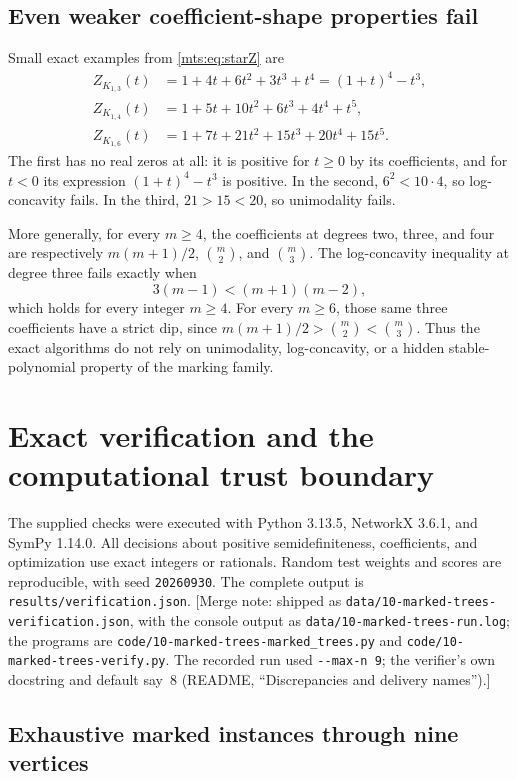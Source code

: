 \documentclass[11pt]{article}
\numberwithin{equation}{section}
\theoremstyle{definition}
\begin{document}
\subsection{Even weaker coefficient-shape properties fail}

Small exact examples from \eqref{mts:eq:starZ} are
\begin{align}
 Z_{K_{1,3}}(t)&=1+4t+6t^2+3t^3+t^4=(1+t)^4-t^3,\label{mts:eq:Z3}\\
 Z_{K_{1,4}}(t)&=1+5t+10t^2+6t^3+4t^4+t^5,\label{mts:eq:Z4}\\
 Z_{K_{1,6}}(t)&=1+7t+21t^2+15t^3+20t^4+15t^5.
 \label{mts:eq:Z6}
\end{align}
The first has no real zeros at all: it is positive for $t\ge0$ by its
coefficients, and for $t<0$ its expression $(1+t)^4-t^3$ is positive.
In the second, $6^2<10\cdot4$, so log-concavity fails. In the third,
$21>15<20$, so unimodality fails.

More generally, for every $m\ge4$, the coefficients at degrees two,
three, and four are respectively $m(m+1)/2$, $\binom m2$, and
$\binom m3$. The log-concavity inequality at degree three fails exactly
when
\[
 3(m-1)<(m+1)(m-2),
\]
which holds for every integer $m\ge4$. For every $m\ge6$, those same three
coefficients have a strict dip, since
$m(m+1)/2>\binom m2<\binom m3$. Thus the exact algorithms do not rely on
unimodality, log-concavity, or a hidden stable-polynomial property of the
marking family.

\section{Exact verification and the computational trust boundary}\label{mts:sec:verification}

The supplied checks were executed with Python 3.13.5, NetworkX 3.6.1, and
SymPy 1.14.0. All decisions about positive semidefiniteness, coefficients,
and optimization use exact integers or rationals. Random test weights and
scores are reproducible, with seed \texttt{20260930}. The complete output
is \texttt{results/verification.json}.
[Merge note: shipped as \nolinkurl{data/10-marked-trees-verification.json},
with the console output as \nolinkurl{data/10-marked-trees-run.log}; the
programs are \nolinkurl{code/10-marked-trees-marked_trees.py} and
\nolinkurl{code/10-marked-trees-verify.py}. The recorded run used
\texttt{-{}-max-n 9}; the verifier's own docstring and default say~8
(README, ``Discrepancies and delivery names'').]

\subsection{Exhaustive marked instances through nine vertices}
\end{document}
